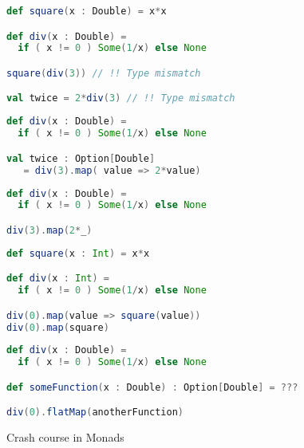 \documentclass[10pt]{beamer}
\begin{document}
\begin{frame}[fragile]
\begin{lstlisting}[language=Scala, basicstyle=\ttfamily]
def square(x : Double) = x*x 

def div(x : Double) = 
  if ( x != 0 ) Some(1/x) else None

square(div(3)) // !! Type mismatch 

val twice = 2*div(3) // !! Type mismatch 
\end{lstlisting}
\end{frame}

\begin{frame}[fragile]
\begin{lstlisting}[language=Scala, basicstyle=\ttfamily]
def div(x : Double) = 
  if ( x != 0 ) Some(1/x) else None

val twice : Option[Double] 
   = div(3).map( value => 2*value)
\end{lstlisting}
\end{frame}

\begin{frame}[fragile]
\begin{lstlisting}[language=Scala, basicstyle=\ttfamily]
def div(x : Double) = 
  if ( x != 0 ) Some(1/x) else None

div(3).map(2*_)
\end{lstlisting}
\end{frame}

\begin{frame}[fragile]
\begin{lstlisting}[language=Scala, basicstyle=\ttfamily]
def square(x : Int) = x*x 

def div(x : Int) = 
  if ( x != 0 ) Some(1/x) else None

div(0).map(value => square(value))
div(0).map(square)
\end{lstlisting}
\end{frame}

\begin{frame}[fragile]
\begin{lstlisting}[language=Scala, basicstyle=\ttfamily]
def div(x : Double) = 
  if ( x != 0 ) Some(1/x) else None

def someFunction(x : Double) : Option[Double] = ???

div(0).flatMap(anotherFunction)
\end{lstlisting}
\end{frame}

\begin{frame}
Crash course in Monads 
\end{frame}
\end{document}
